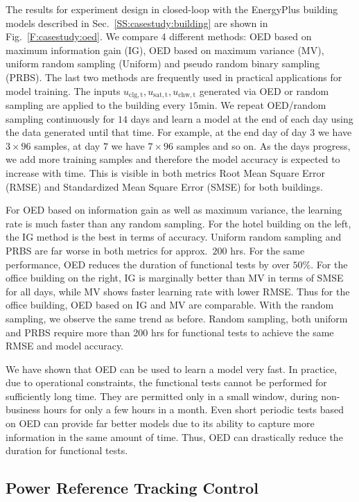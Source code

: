 The results for experiment design in closed-loop with the EnergyPlus building models described in Sec.~\ref{SS:casestudy:building} are shown in Fig.~\ref{F:casestudy:oed}.
We compare 4 different methods: OED based on maximum information gain (IG), OED based on maximum variance (MV), uniform random sampling (Uniform) and pseudo random binary sampling (PRBS).
The last two methods are frequently used in practical applications for model training.
The inputs \(u_{\mathrm{clg,t}},u_{\mathrm{sat,t}},u_{\mathrm{chw,t}}\) generated via OED or random sampling are applied to the building every \(15 \mathrm{min}\).
We repeat OED/random sampling continuously for \(14\) days and learn a model at the end of each day using the data generated until that time. 
For example, at the end day of day \(3\) we have \(3\times96\) samples, at day \(7\) we have \(7\times96\) samples and so on. 
As the days progress, we add more training samples and therefore the model accuracy is expected to increase with time. 
This is visible in both metrics Root Mean Square Error (RMSE) and Standardized Mean Square Error (SMSE) for both buildings.

For OED based on information gain as well as maximum variance, the learning rate is much faster than any random sampling.
For the hotel building on the left, the IG method is the best in terms of accuracy. %
Uniform random sampling and PRBS are far worse in both metrics for approx.~\(200\) hrs. For the same performance, OED reduces the duration of functional tests by over \(50\%\).
For the office building on the right, IG is marginally better than MV in terms of SMSE for all days, while MV shows faster learning rate with lower RMSE. 
Thus for the office building, OED based on IG and MV are comparable. 
With the random sampling, we observe the same trend as before.
Random sampling, both uniform and PRBS require more than 200 hrs for functional tests to achieve the same RMSE and model accuracy.

We have shown that OED can be used to learn a model very fast.
In practice, due to operational constraints, the functional tests cannot be performed for sufficiently long time. 
They are permitted only in a small window, during non-business hours for only a few hours in a month. 
Even short periodic tests based on OED can provide far better models due to its ability to capture more information in the same amount of time.
Thus, OED can drastically reduce the duration for functional tests.

\subsection{Power Reference Tracking Control}
\label{SS:power_tracking}

